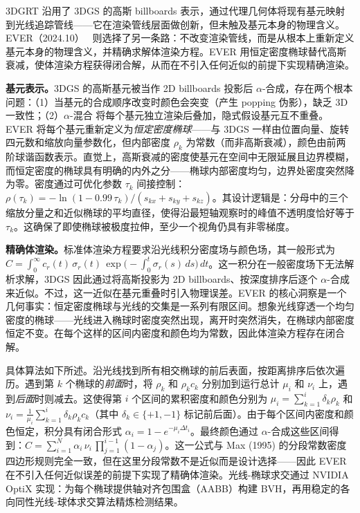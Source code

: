 3DGRT 沿用了 3DGS 的高斯 billboards 表示，通过代理几何体将现有基元映射到光线追踪管线——它在渲染管线层面做创新，但未触及基元本身的物理含义。EVER（2024.10）~\cite{2410_01804} 则选择了另一条路：不改变渲染管线，而是从根本上重新定义基元本身的物理含义，并精确求解体渲染方程。EVER 用恒定密度椭球替代高斯衰减，使体渲染方程获得闭合解，从而在不引入任何近似的前提下实现精确渲染。

\textbf{基元表示。}3DGS 的高斯基元被当作 2D billboards 投影后 $\alpha$-合成，存在两个根本问题：（1）当基元的合成顺序改变时颜色会突变（产生 popping 伪影），缺乏 3D 一致性；（2）$\alpha$-混合 将每个基元独立渲染后叠加，隐式假设基元互不重叠。EVER 将每个基元重新定义为\emph{恒定密度椭球}——与 3DGS 一样由位置向量、旋转四元数和缩放向量参数化，但内部密度 $\rho_k$ 为常数（而非高斯衰减），颜色由前两阶球谐函数表示。直觉上，高斯衰减的密度使基元在空间中无限延展且边界模糊，而恒定密度的椭球具有明确的内外之分——椭球内部密度均匀，边界处密度突然降为零。密度通过可优化参数 $\tau_k$ 间接控制：$\rho(\tau_k) = -\ln(1 - 0.99\,\tau_k) / (s_{kx} + s_{ky} + s_{kz})$。其设计逻辑是：分母中的三个缩放分量之和近似椭球的平均直径，使得沿最短轴观察时的峰值不透明度恰好等于 $\tau_k$。这确保了即使椭球被极度拉伸，至少一个视角仍具有非零梯度。

\textbf{精确体渲染。}标准体渲染方程要求沿光线积分密度场与颜色场，其一般形式为 $C = \int_0^\infty c_r(t)\,\sigma_r(t)\,\exp\!\bigl(-\int_0^t \sigma_r(s)\,ds\bigr)\,dt$。这一积分在一般密度场下无法解析求解，3DGS 因此通过将高斯投影为 2D billboards、按深度排序后逐个 $\alpha$-合成来近似。不过，这一近似在基元重叠时引入物理误差。EVER 的核心洞察是一个几何事实：恒定密度椭球与光线的交集是一系列有限区间。想象光线穿透一个均匀密度的椭球——光线进入椭球时密度突然出现，离开时突然消失，在椭球内部密度恒定不变。在每个这样的区间内密度和颜色均为常数，因此体渲染方程存在闭合解。

具体算法如下所述。沿光线找到所有相交椭球的前后表面，按距离排序后依次遍历。遇到第 $k$ 个椭球的\emph{前面}时，将 $\rho_k$ 和 $\rho_k c_k$ 分别加到运行总计 $\mu_i$ 和 $\nu_i$ 上，遇到\emph{后面}时则减去。这使得第 $i$ 个区间的累积密度和颜色分别为 $\mu_i = \sum_{k=1}^i \delta_k \rho_k$ 和 $\nu_i = \frac{1}{\mu_i}\sum_{k=1}^i \delta_k \rho_k c_k$（其中 $\delta_k \in \{+1,-1\}$ 标记前后面）。由于每个区间内密度和颜色恒定，积分具有闭合形式 $\alpha_i = 1 - e^{-\mu_i \Delta t_i}$。最终颜色通过 $\alpha$-合成这些区间得到：$C = \sum_{i=1}^N \alpha_i\,\nu_i\,\prod_{j=1}^{i-1}(1-\alpha_j)$。这一公式与 Max (1995) 的分段常数密度四边形规则完全一致，但在这里分段常数不是近似而是设计选择——因此 EVER 在不引入任何近似误差的前提下实现了精确体渲染。光线-椭球求交通过 NVIDIA OptiX 实现：为每个椭球提供轴对齐包围盒（AABB）构建 BVH，再用稳定的各向同性光线-球体求交算法精炼检测结果。

